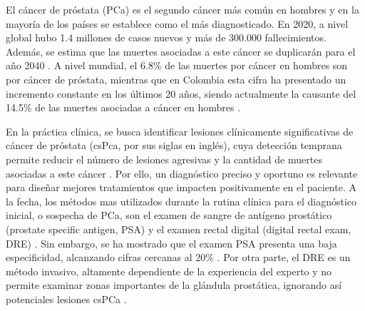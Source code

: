 




El cáncer de próstata (PCa) es el segundo cáncer más común en hombres y en la mayoría de los países se establece como el más diagnosticado. En 2020, a nivel global hubo 1.4 millones de casos nuevos y más de 300.000 fallecimientos. Además, se estima que las muertes asociadas a este cáncer se duplicarán para el año 2040 . A nivel mundial, el 6.8\% de las muertes por cáncer en hombres son por cáncer de próstata, mientras que en Colombia esta cifra ha presentado un incremento constante en los últimos 20 años, siendo actualmente la causante del 14.5\% de las muertes asociadas a cáncer en hombres  .\par

En la práctica clínica, se busca identificar lesiones clínicamente significativas de cáncer de próstata (csPca, por sus siglas en inglés), cuya detección temprana permite reducir el número de lesiones agresivas y la cantidad de muertes asociadas a este cáncer . Por ello, un diagnóstico preciso y oportuno es relevante para diseñar mejores tratamientos que impacten positivamente en el paciente. A la fecha, los métodos mas utilizados durante la rutina clínica para el diagnóstico inicial, o sospecha de PCa, son el examen de sangre de antígeno prostático (prostate specific antigen, PSA) y el examen rectal digital (digital rectal exam, DRE) . Sin embargo, se ha mostrado que el examen PSA presenta una baja especificidad, alcanzando cifras cercanas al 20\% . Por otra parte, el DRE es un método invasivo, altamente dependiente de la experiencia del experto y no permite examinar zonas importantes de la glándula prostática, ignorando así potenciales lesiones csPCa .\par


